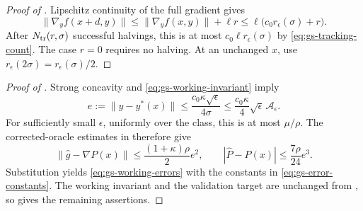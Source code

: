 \documentclass{article}
\begin{document}
\begin{proof}[Proof of ]
Lipschitz continuity of the full gradient gives
\[
 \|\nabla_yf(x+d,y)\|
 \le\|\nabla_yf(x,y)\|+\ell r
 \le\ell\bigl(c_0r_\epsilon(\sigma)+r\bigr).
\]
After $N_{\rm tr}(r,\sigma)$ successful halvings, this is at most
$c_0\ell r_\epsilon(\sigma)$ by \eqref{eq:gs-tracking-count}.
The case $r=0$ requires no halving.  At an unchanged $x$, use
$r_\epsilon(2\sigma)=r_\epsilon(\sigma)/2$.
\end{proof}

\begin{proof}[Proof of ]
Strong concavity and \eqref{eq:gs-working-invariant} imply
\[
 e:=\|y-y^*(x)\|
 \le\frac{c_0\kappa\sqrt\epsilon}{4\sigma}
 \le\frac{c_0\kappa}{4}\sqrt\epsilon\,\mathcal A_\epsilon.
\]
For sufficiently small $\epsilon$, uniformly over the class, this is
at most $\mu/\rho$.  The corrected-oracle estimates in
 therefore give
\[
 \|\widehat g-\nabla P(x)\|
 \le\frac{(1+\kappa)\rho}{2}e^2,
 \qquad
 |\widehat P-P(x)|\le\frac{7\rho}{24}e^3.
\]
Substitution yields \eqref{eq:gs-working-errors} with the constants
in \eqref{eq:gs-error-constants}.  The working invariant and the
validation target are unchanged from , so
 gives the remaining assertions.
\end{proof}
\end{document}
